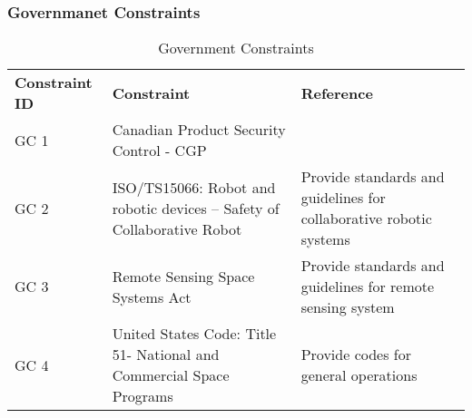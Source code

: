 \subsubsection{Governmanet Constraints}
\begin{table}[H]
\label{govt_constraints}
\caption{Government Constraints}
\centering
\begin{tabular}{|P{3cm}|P{6.2cm}|P{6cm}|}
\hline
\textbf{Constraint ID}	&	\textbf{Constraint}	&	\textbf{Reference}	\\\hhline{|=|=|=|}
GC 1	&
Canadian Product Security Control - \gls{CGP}	&
	\\\hline
GC 2	&
\acrshort{ISO}/TS15066: Robot and robotic devices -- Safety of Collaborative Robot	&
Provide standards and guidelines for collaborative robotic systems	\\\hline
GC 3	&
Remote Sensing Space Systems Act	&
Provide standards and guidelines for remote sensing system	\\\hline
GC 4	&
United States Code: Title 51- National and Commercial Space Programs	&
Provide codes for general operations	\\\hline
\end{tabular}
\end{table}